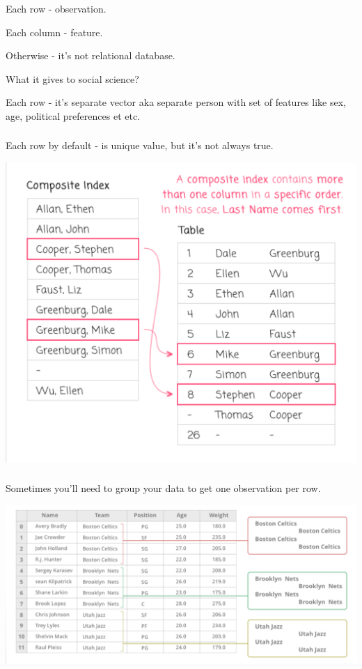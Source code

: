 \documentclass[t, 11pt]{beamer}
\begin{document}
		\begin{frame} 
		\frametitle{\insertsection} 
		\framesubtitle{\insertsubsection}
	Each row - observation.
	
	Each column - feature. 
	
	Otherwise - it's not relational database. 
	
	\vspace{1cm}
	
	What it gives to social science?
	
	Each row - it's separate vector aka separate person with set of features like sex, age, political preferences et etc. 
	
	\end{frame} 

	\begin{frame} 
	\frametitle{\insertsection} 
	\framesubtitle{\insertsubsection}
 	Each row by default - is unique value, but it's not always true. 
 	\begin{center}
	 	\includegraphics[scale=0.3]{comp_index}
 	\end{center}
	\end{frame} 

	\begin{frame} 
	\frametitle{\insertsection} 
	\framesubtitle{\insertsubsection}
	Sometimes you'll need to group your data to get one observation per row.
	
	 	\begin{center}
		\includegraphics[scale=0.3]{group}
	\end{center}

\end{frame} 
\end{document}
